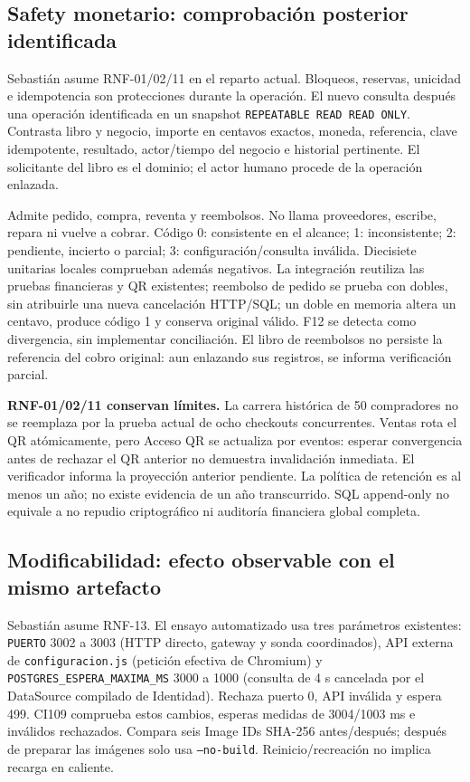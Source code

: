 \subsection{Safety monetario: comprobación posterior identificada}
Sebastián asume RNF-01/02/11 en el reparto actual. Bloqueos, reservas, unicidad e
idempotencia son protecciones durante la operación. El nuevo
 consulta después una operación
identificada en un snapshot \texttt{REPEATABLE READ READ ONLY}. Contrasta libro y
negocio, importe en centavos exactos, moneda, referencia, clave idempotente,
resultado, actor/tiempo del negocio e historial pertinente. El solicitante del
libro es el dominio; el actor humano procede de la operación enlazada.

Admite pedido, compra, reventa y reembolsos. No llama proveedores, escribe,
repara ni vuelve a cobrar. Código 0: consistente en el alcance; 1: inconsistente;
2: pendiente, incierto o parcial; 3: configuración/consulta inválida.
Diecisiete unitarias locales comprueban además negativos. La integración reutiliza
las pruebas financieras y QR existentes; reembolso de pedido se prueba con dobles,
sin atribuirle una nueva cancelación HTTP/SQL; un doble en memoria altera un centavo,
produce código 1 y conserva original válido. F12 se detecta como divergencia,
sin implementar conciliación. El libro de reembolsos no persiste la referencia
del cobro original: aun enlazando sus registros, se informa verificación parcial.

\textbf{RNF-01/02/11 conservan límites.} La carrera histórica de 50 compradores
no se reemplaza por la prueba actual de ocho checkouts concurrentes. Ventas rota
el QR atómicamente, pero Acceso QR se actualiza por eventos: esperar convergencia
antes de rechazar el QR anterior no demuestra invalidación inmediata. El
verificador informa la proyección anterior pendiente. La política de retención
es al menos un año; no existe evidencia de un año transcurrido. SQL append-only
no equivale a no repudio criptográfico ni auditoría financiera global completa.

\subsection{Modificabilidad: efecto observable con el mismo artefacto}
Sebastián asume RNF-13. El ensayo automatizado usa tres parámetros existentes:
\texttt{PUERTO} 3002 a 3003 (HTTP directo, gateway y sonda coordinados), API externa
de \texttt{configuracion.js} (petición efectiva de Chromium) y
\texttt{POSTGRES\_ESPERA\_MAXIMA\_MS} 3000 a 1000 (consulta de 4 s cancelada por
el DataSource compilado de Identidad). Rechaza puerto 0, API inválida y espera
499. CI109 comprueba estos cambios, esperas medidas de 3004/1003 ms e inválidos
rechazados. Compara seis Image IDs SHA-256 antes/después; después de preparar las imágenes
solo usa \texttt{--no-build}. Reinicio/recreación no implica recarga en caliente.

